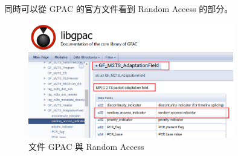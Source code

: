 \documentclass[10pt,UTF8]{ctexart}
\begin{document}
同時可以從 GPAC 的官方文件看到 Random Access 的部分。

\begin{figure}[H]
\centering 
\includegraphics[width=0.80\textwidth]{g7.png} 
\caption{文件 GPAC 與 Random Access }
\label{Test}
\end{figure}








\clearpage
\end{document}
